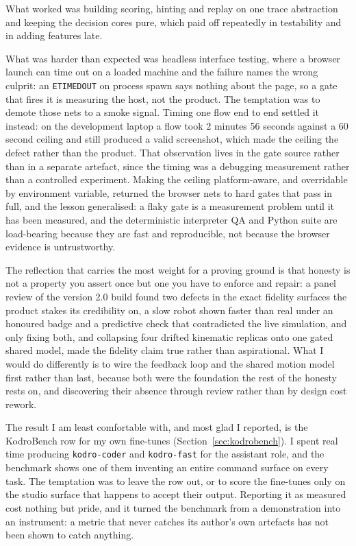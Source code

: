 \documentclass[11pt,a4paper]{report}
\begin{document}
What worked was building scoring, hinting and replay on one trace abstraction and keeping the decision cores pure, which paid off repeatedly in testability and in adding features late.

What was harder than expected was headless interface testing, where a browser launch can time out on a loaded machine and the failure names the wrong culprit: an \texttt{ETIMEDOUT} on process spawn says nothing about the page, so a gate that fires it is measuring the host, not the product. The temptation was to demote those nets to a smoke signal. Timing one flow end to end settled it instead: on the development laptop a flow took 2 minutes 56 seconds against a 60 second ceiling and still produced a valid screenshot, which made the ceiling the defect rather than the product. That observation lives in the gate source rather than in a separate artefact, since the timing was a debugging measurement rather than a controlled experiment. Making the ceiling platform-aware, and overridable by environment variable, returned the browser nets to hard gates that pass in full, and the lesson generalised: a flaky gate is a measurement problem until it has been measured, and the deterministic interpreter QA and Python suite are load-bearing because they are fast and reproducible, not because the browser evidence is untrustworthy.

The reflection that carries the most weight for a proving ground is that honesty is not a property you assert once but one you have to enforce and repair: a panel review of the version 2.0 build found two defects in the exact fidelity surfaces the product stakes its credibility on, a slow robot shown faster than real under an honoured badge and a predictive check that contradicted the live simulation, and only fixing both, and collapsing four drifted kinematic replicas onto one gated shared model, made the fidelity claim true rather than aspirational. What I would do differently is to wire the feedback loop and the shared motion model first rather than last, because both were the foundation the rest of the honesty rests on, and discovering their absence through review rather than by design cost rework.

The result I am least comfortable with, and most glad I reported, is the KodroBench row for my own fine-tunes (Section~\ref{sec:kodrobench}). I spent real time producing \texttt{kodro-coder} and \texttt{kodro-fast} for the assistant role, and the benchmark shows one of them inventing an entire command surface on every task. The temptation was to leave the row out, or to score the fine-tunes only on the studio surface that happens to accept their output. Reporting it as measured cost nothing but pride, and it turned the benchmark from a demonstration into an instrument: a metric that never catches its author's own artefacts has not been shown to catch anything.
\end{document}
